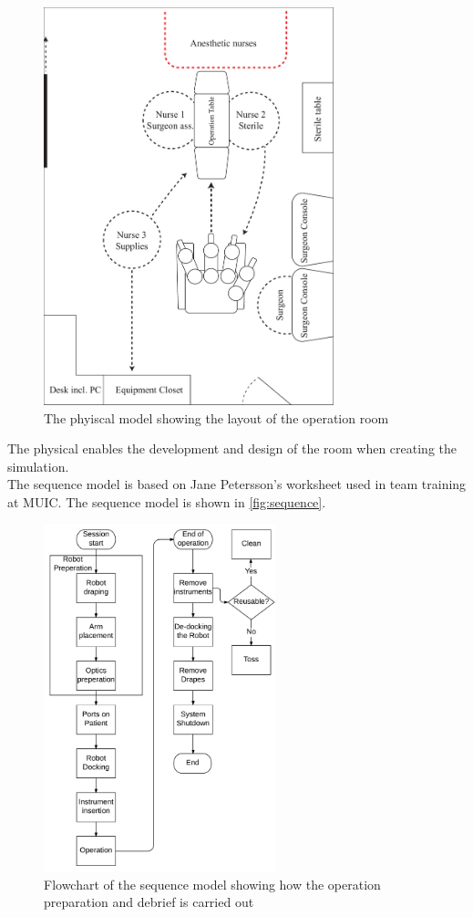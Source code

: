 \begin{figure}[hpbt]
	\centering
	\includegraphics[width=0.75\textwidth]{OperationRoom/physical}
	\caption{The phyiscal model showing the layout of the operation room}
	\label{fig:layout}
\end{figure}

The physical enables the development and design of the room when creating the simulation.\\

The sequence model is based on Jane Petersson's worksheet used in team training at MUIC. The sequence model is shown in \autoref{fig:sequence}.

\begin{figure}[hbpt]
	\centering
	\includegraphics[width=0.6\textwidth]{OperationRoom/sequencemodel}
	\caption{Flowchart of the sequence model showing how the operation preparation and debrief is carried out}
	\label{fig:sequence}
\end{figure}

